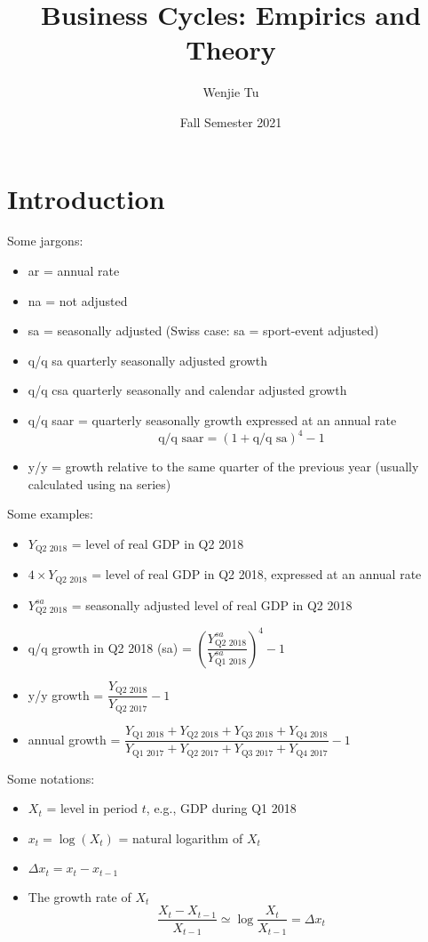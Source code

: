 \documentclass{article}
\title{%
     Business Cycles: Empirics and Theory
}
\author{Wenjie Tu}
\date{Fall Semester 2021}
\begin{document}
\maketitle

\section{Introduction}

Some jargons:

\begin{itemize}
    \item ar = annual rate
    \item na = not adjusted
    \item sa = seasonally adjusted (Swiss case: sa = sport-event adjusted)
    \item q/q sa quarterly seasonally adjusted growth
    \item q/q csa quarterly seasonally and calendar adjusted growth
    \item q/q saar = quarterly seasonally growth expressed at an annual rate
    \[\textrm{q}/\textrm{q saar} = (1+\textrm{q/q sa})^4 - 1\]
    \item y/y = growth relative to the same quarter of the previous year (usually calculated using na series)
\end{itemize}

Some examples:

\begin{itemize}
    \item $Y_\text{Q2 2018}$ = level of real GDP in Q2 2018
    \item $4\times Y_\text{Q2 2018}$ = level of real GDP in Q2 2018, expressed at an annual rate
    \item $Y_\text{Q2 2018}^{sa}$ = seasonally adjusted level of real GDP in Q2 2018
    \item q/q growth in Q2 2018 (sa) = $\left(\dfrac{Y_\text{Q2 2018}^{sa}}{Y_\text{Q1 2018}^{sa}}\right)^4-1$
    \item y/y growth = $\dfrac{Y_\text{Q2 2018}}{Y_\text{Q2 2017}}-1$
    \item annual growth = $\dfrac{Y_\text{Q1 2018}+Y_\text{Q2 2018}+Y_\text{Q3 2018}+Y_\text{Q4 2018}}{Y_\text{Q1 2017}+Y_\text{Q2 2017}+Y_\text{Q3 2017}+Y_\text{Q4 2017}}-1$
\end{itemize}

Some notations:

\begin{itemize}
    \item $X_t$ = level in period $t$, e.g., GDP during Q1 2018
    \item $x_t=\log(X_t)$ = natural logarithm of $X_t$
    \item $\Delta x_t=x_t-x_{t-1}$
    \item The growth rate of $X_t$
    \[\dfrac{X_t-X_{t-1}}{X_{t-1}}\simeq\log\dfrac{X_t}{X_{t-1}}=\Delta x_t \]
\end{itemize}
\end{document}
